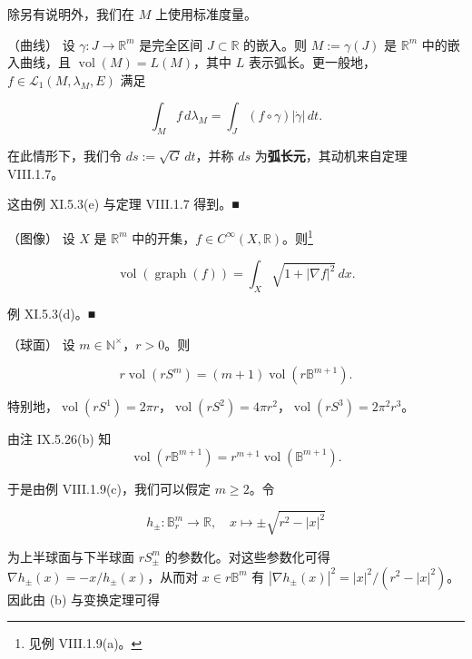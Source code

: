 \begin{example}

除另有说明外，我们在 $ M $ 上使用标准度量。

\begin{items}
\item

（曲线） 设 $ \gamma: J \to \mathbb{R}^m $ 是完全区间 $ J \subset \mathbb{R} $ 的嵌入。则 $ M := \gamma(J) $ 是 $ \mathbb{R}^m $ 中的嵌入曲线，且 $ \operatorname{vol}(M) = L(M) $，其中 $ L $ 表示弧长。更一般地，$ f \in \mathcal{L}_1(M, \lambda_M, E) $ 满足

\[
\int_M f \, d\lambda_M = \int_J (f \circ \gamma)|\dot\gamma| \, dt .
\]

在此情形下，我们令 $ ds := \sqrt{G} \, dt $，并称 $ ds $ 为\textbf{弧长元}，其动机来自定理 VIII.1.7。

\proofhead
这由例 XI.5.3(e) 与定理 VIII.1.7 得到。\nobreak\hspace{0.35em}■
\item

（图像） 设 $ X $ 是 $ \mathbb{R}^m $ 中的开集，$ f \in C^\infty(X, \mathbb{R}) $。则\footnote{见例 VIII.1.9(a)。}

\[
\operatorname{vol}(\operatorname{graph}(f)) = \int_X \sqrt{1 + |\nabla f|^2} \, dx .
\]

\proofhead
例 XI.5.3(d)。\nobreak\hspace{0.35em}■
\item

（球面） 设 $ m \in \mathbb{N}^\times $，$ r > 0 $。则

\[
r \operatorname{vol}(rS^m) = (m+1)\operatorname{vol}(r\mathbb{B}^{m+1}) .
\]

特别地，$ \operatorname{vol}(rS^1) = 2\pi r $，$ \operatorname{vol}(rS^2) = 4\pi r^2 $，$ \operatorname{vol}(rS^3) = 2\pi^2 r^3 $。

\proofhead
由注 IX.5.26(b) 知
\begin{equation}
\operatorname{vol}(r\mathbb{B}^{m+1}) = r^{m+1}\operatorname{vol}(\mathbb{B}^{m+1}) .\tag{1.9}
\end{equation}

于是由例 VIII.1.9(c)，我们可以假定 $ m \ge 2 $。令

\[
h_\pm: \mathbb{B}^m_r \to \mathbb{R} , \quad x \mapsto \pm\sqrt{r^2 - |x|^2}
\]

为上半球面与下半球面 $ rS^m_\pm $ 的参数化。对这些参数化可得 $ \nabla h_\pm(x) = -x/h_\pm(x) $，从而对 $ x \in r\mathbb{B}^m $ 有 $ |\nabla h_\pm(x)|^2 = |x|^2/(r^2 - |x|^2) $。因此由 (b) 与变换定理可得


\end{items}
\end{example}
